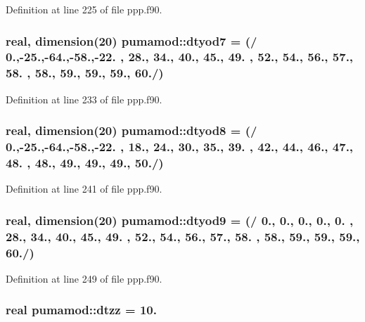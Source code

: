 \-Definition at line 225 of file ppp.\-f90.

\hypertarget{classpumamod_a062241f749f35c2747f925d690b667ef}{
\subsubsection[{dtyod7}]{\setlength{\rightskip}{0pt plus 5cm}real, dimension(20) {\bf pumamod\-::dtyod7} = (/ 0.,-\/25.,-\/64.,-\/58.,-\/22. , 28., 34., 40., 45., 49. , 52., 54., 56., 57., 58. , 58., 59., 59., 59., 60./)}}
\label{classpumamod_a062241f749f35c2747f925d690b667ef}


\-Definition at line 233 of file ppp.\-f90.

\hypertarget{classpumamod_a850c526a93c8b38f08112d84f46c3d61}{
\subsubsection[{dtyod8}]{\setlength{\rightskip}{0pt plus 5cm}real, dimension(20) {\bf pumamod\-::dtyod8} = (/ 0.,-\/25.,-\/64.,-\/58.,-\/22. , 18., 24., 30., 35., 39. , 42., 44., 46., 47., 48. , 48., 49., 49., 49., 50./)}}
\label{classpumamod_a850c526a93c8b38f08112d84f46c3d61}


\-Definition at line 241 of file ppp.\-f90.

\hypertarget{classpumamod_a9599e6b32e3833c098fe5029b7ee70be}{
\subsubsection[{dtyod9}]{\setlength{\rightskip}{0pt plus 5cm}real, dimension(20) {\bf pumamod\-::dtyod9} = (/ 0., 0., 0., 0., 0. , 28., 34., 40., 45., 49. , 52., 54., 56., 57., 58. , 58., 59., 59., 59., 60./)}}
\label{classpumamod_a9599e6b32e3833c098fe5029b7ee70be}


\-Definition at line 249 of file ppp.\-f90.

\hypertarget{classpumamod_af197fe0d42694469ea20c754ddfb1172}{
\subsubsection[{dtzz}]{\setlength{\rightskip}{0pt plus 5cm}real {\bf pumamod\-::dtzz} = 10.}}
\label{classpumamod_af197fe0d42694469ea20c754ddfb1172}



